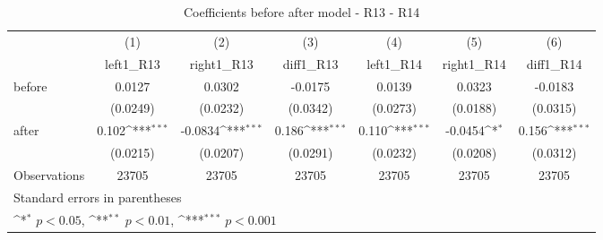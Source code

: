 \begin{table}[!ht]\centering \footnotesize
\def\sym#1{\ifmmode^{#1}\else\(^{#1}\)\fi}
\caption{Coefficients before after model - R13 - R14}
\begin{tabular}{l*{6}{c}}
\hline\hline
                    &\multicolumn{1}{c}{(1)}&\multicolumn{1}{c}{(2)}&\multicolumn{1}{c}{(3)}&\multicolumn{1}{c}{(4)}&\multicolumn{1}{c}{(5)}&\multicolumn{1}{c}{(6)}\\
                    &\multicolumn{1}{c}{left1\_R13}&\multicolumn{1}{c}{right1\_R13}&\multicolumn{1}{c}{diff1\_R13}&\multicolumn{1}{c}{left1\_R14}&\multicolumn{1}{c}{right1\_R14}&\multicolumn{1}{c}{diff1\_R14}\\
\hline
before              &      0.0127         &      0.0302         &     -0.0175         &      0.0139         &      0.0323         &     -0.0183         \\
                    &    (0.0249)         &    (0.0232)         &    (0.0342)         &    (0.0273)         &    (0.0188)         &    (0.0315)         \\
[1em]
after               &       0.102\sym{***}&     -0.0834\sym{***}&       0.186\sym{***}&       0.110\sym{***}&     -0.0454\sym{*}  &       0.156\sym{***}\\
                    &    (0.0215)         &    (0.0207)         &    (0.0291)         &    (0.0232)         &    (0.0208)         &    (0.0312)         \\
\hline
Observations        &       23705         &       23705         &       23705         &       23705         &       23705         &       23705         \\
\hline\hline
\multicolumn{7}{l}{\footnotesize Standard errors in parentheses}\\
\multicolumn{7}{l}{\footnotesize \sym{*} \(p<0.05\), \sym{**} \(p<0.01\), \sym{***} \(p<0.001\)}\\
\end{tabular}
\end{table}
